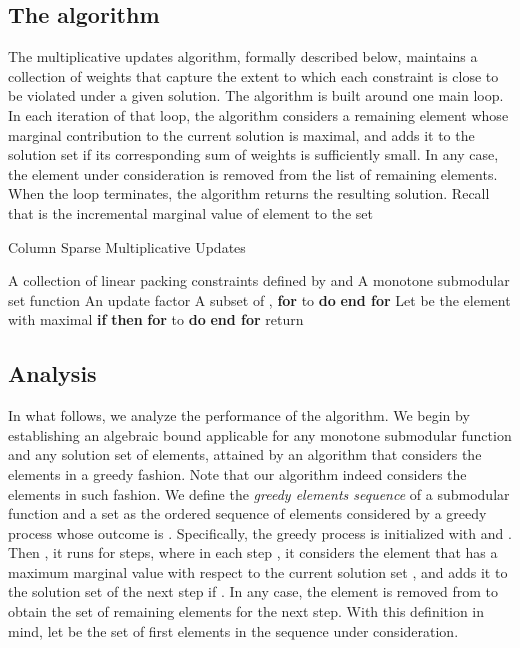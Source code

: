 \documentclass[11pt]{article}
\theoremstyle{plain}
\theoremstyle{definition}
\begin{document}
\subsection{The algorithm} \label{subsec:SparseAlgorithm}
The multiplicative updates algorithm, formally described below,
maintains a collection of weights that capture the extent to which
each constraint is close to be violated under a given solution.
The algorithm is built around one main loop. In each iteration of
that loop, the algorithm considers a remaining element whose
marginal contribution to the current solution is maximal, and adds
it to the solution set if its corresponding sum of weights is
sufficiently small. In any case, the element under consideration
is removed from the list of remaining elements. When the loop
terminates, the algorithm returns the resulting solution. Recall
that  is the incremental marginal
value of element  to the set 

\begin{algorithm}
\caption{Column Sparse Multiplicative Updates}\label{cap:SparseMultiplicativeUpdates}\begin{algorithmic}[1]
\Require A collection of linear packing constraints defined by  and  \Statex \qquad\; A monotone submodular set function  \Statex \qquad\; An update factor  \Ensure A subset of  \smallskip 
\State ,  \State \textbf{for}  to  \textbf{do}  \textbf{end for} \smallskip 
\While{} \label{alg:SparseStopCond} \State Let  be the element with maximal  \State \textbf{if}  \textbf{then}  \State  \State \textbf{for}  to  \textbf{do}  \textbf{end for} \label{alg:SparseWeightUpdate} \EndWhile \smallskip 
\State return  \end{algorithmic}
\end{algorithm}


\subsection{Analysis} \label{subsec:Analysis}
In what follows, we analyze the performance of the algorithm. We
begin by establishing an algebraic bound applicable for any
monotone submodular function and any solution set of elements,
attained by an algorithm that considers the elements in a greedy
fashion. Note that our algorithm indeed considers the elements in
such fashion. We define the \emph{greedy elements sequence}
 of a
submodular function  and a set  as the ordered sequence of
elements considered by a greedy process whose outcome is .
Specifically, the greedy process is initialized with 
and . Then , it runs for  steps, where in each
step , it considers the element  that has a
maximum marginal value with respect to the current solution set
, and adds it to the solution set  of the next step
if . In any case, the element  is removed from
 to obtain the set  of remaining elements for the
next step. With this definition in mind, let  be the set of first  elements in the
sequence under consideration.
\end{document}
